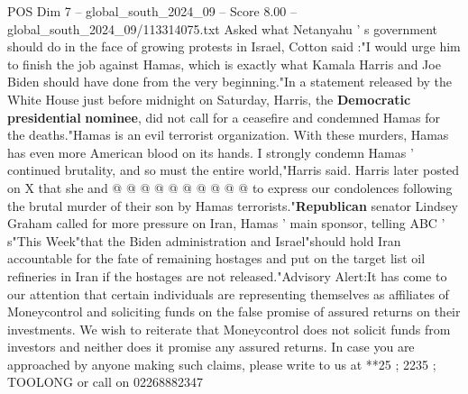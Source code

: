 \begin{textsample}{POS Dim 7 – global\_south\_2024\_09 – Score 8.00 – global\_south\_2024\_09/113314075.txt}
Asked what Netanyahu ' s government should do in the face of growing protests in Israel, Cotton said :"I would urge him to finish the job against Hamas, which is exactly what Kamala Harris and Joe Biden should have done from the very beginning."In a statement released by the White House just before midnight on Saturday, Harris, the \textbf{Democratic} \textbf{presidential} \textbf{nominee}, did not call for a ceasefire and condemned Hamas for the deaths."Hamas is an evil terrorist organization.
With these murders, Hamas has even more American blood on its hands.
I strongly condemn Hamas ' continued brutality, and so must the entire world,"Harris said.
Harris later posted on X that she and @ @ @ @ @ @ @ @ @ @ to express our condolences following the brutal murder of their son by Hamas terrorists."\textbf{Republican} senator Lindsey Graham called for more pressure on Iran, Hamas ' main sponsor, telling ABC ' s"This Week"that the Biden administration and Israel"should hold Iran accountable for the fate of remaining hostages and put on the target list oil refineries in Iran if the hostages are not released."Advisory Alert:It has come to our attention that certain individuals are representing themselves as affiliates of Moneycontrol and soliciting funds on the false promise of assured returns on their investments.
We wish to reiterate that Moneycontrol does not solicit funds from investors and neither does it promise any assured returns.
In case you are approached by anyone making such claims, please write to us at **25 ; 2235 ; TOOLONG or call on 02268882347

\end{textsample}
